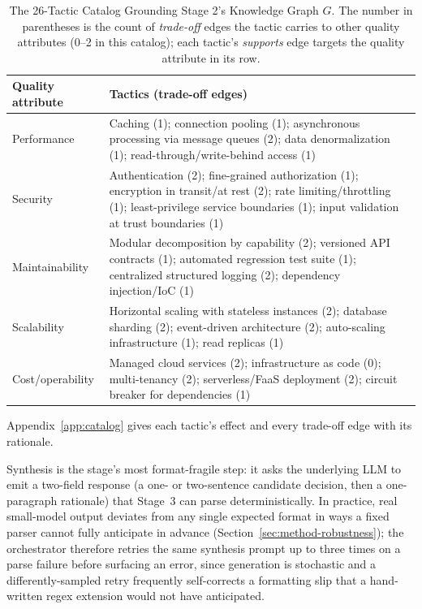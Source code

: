 \documentclass[preprint,12pt,authoryear]{elsarticle}
\renewcommand{\_}{\textunderscore\allowbreak{}}
\begin{document}
\begin{table}[!htbp]
\caption{The 26-Tactic Catalog Grounding Stage 2's Knowledge Graph $G$. The number in parentheses is the count of \emph{trade-off} edges the tactic carries to other quality attributes (0--2 in this catalog); each tactic's \emph{supports} edge targets the quality attribute in its row.\label{tab:tactics}}
\centering
\footnotesize
\setlength{\tabcolsep}{4pt}
\begin{tabular}{@{}>{\raggedright\arraybackslash}p{0.95in}>{\raggedright\arraybackslash}p{4.25in}@{}}
\toprule
Quality attribute & Tactics (trade-off edges) \\
\midrule
Performance & Caching (1); connection pooling (1); asynchronous processing via message queues (2); data denormalization (1); read-through/write-behind access (1) \\
Security & Authentication (2); fine-grained authorization (1); encryption in transit/at rest (2); rate limiting/throttling (1); least-privilege service boundaries (1); input validation at trust boundaries (1) \\
Maintainability & Modular decomposition by capability (2); versioned API contracts (1); automated regression test suite (1); centralized structured logging (2); dependency injection/IoC (1) \\
Scalability & Horizontal scaling with stateless instances (2); database sharding (2); event-driven architecture (2); auto-scaling infrastructure (1); read replicas (1) \\
Cost/operability & Managed cloud services (2); infrastructure as code (0); multi-tenancy (2); serverless/FaaS deployment (2); circuit breaker for dependencies (1) \\
\bottomrule
\end{tabular}

\vspace{2pt}
\footnotesize Appendix~\ref{app:catalog} gives each tactic's effect and every trade-off edge with its rationale.
\end{table}
\FloatBarrier

Synthesis is the stage's most format-fragile step: it asks the underlying LLM to emit a two-field response (a one- or two-sentence candidate decision, then a one-paragraph rationale) that Stage~3 can parse deterministically. In practice, real small-model output deviates from any single expected format in ways a fixed parser cannot fully anticipate in advance (Section~\ref{sec:method-robustness}); the orchestrator therefore retries the same synthesis prompt up to three times on a parse failure before surfacing an error, since generation is stochastic and a differently-sampled retry frequently self-corrects a formatting slip that a hand-written regex extension would not have anticipated.
\end{document}
